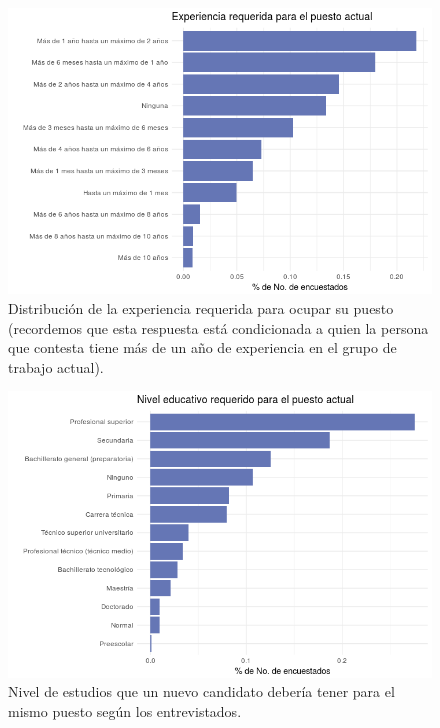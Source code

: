 \documentclass[paper=letter, fontsize=11pt]{scrartcl}
\numberwithin{equation}{section} %
\numberwithin{figure}{section} %
\numberwithin{table}{section} %
\begin{document}
\begin{figure}[H]
  \begin{center}
    \includegraphics[scale=.5]{experiencia.png}
    \caption{Distribución de la experiencia requerida para ocupar su puesto (recordemos que esta respuesta está condicionada a quien la persona que contesta tiene más de un año de experiencia en el grupo de trabajo actual). }
    \label{figura1_7}
  \end{center}
\end{figure}
\FloatBarrier

\begin{figure}[H]
  \begin{center}
    \includegraphics[scale=.5]{educacion.png}
    \caption{Nivel de estudios que un nuevo candidato debería tener para el mismo puesto según los entrevistados.}
    \label{figura1_8}
  \end{center}
\end{figure}
\FloatBarrier
\end{document}

